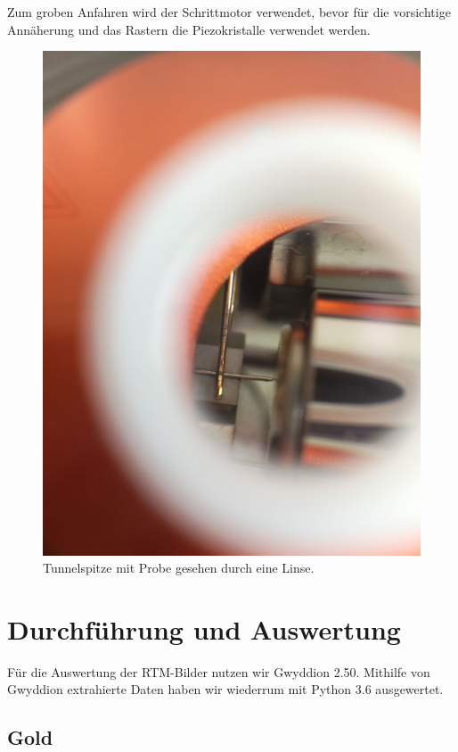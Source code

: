Zum groben Anfahren wird der Schrittmotor verwendet, bevor für die vorsichtige Annäherung und das Rastern die Piezokristalle verwendet werden. 

\begin{figure}[H]
\centering
\includegraphics[width=\textwidth]{../RTM.jpg}
\caption{Tunnelspitze mit Probe gesehen durch eine Linse.}
\label{RTM}
\end{figure}

\section{Durchführung und Auswertung}
Für die Auswertung der RTM-Bilder nutzen wir Gwyddion 2.50. Mithilfe von Gwyddion extrahierte Daten haben wir wiederrum mit Python 3.6 ausgewertet. 

\subsection{Gold}

